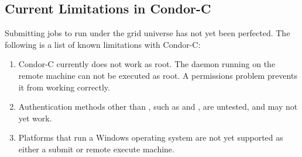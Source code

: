 \subsection{\label{sec:Condor-C-Limits}Current Limitations in Condor-C}
Submitting jobs to run under the grid universe has not yet
been perfected.
The following is a list of known limitations with Condor-C:

\begin{enumerate}
  \item{Condor-C currently does not work as root.
  The  daemon running on the remote machine can not be
  executed as root.
  A permissions problem prevents it from working correctly.  }

  \item{Authentication methods other than
  , such as  and , are 
  untested, and may not yet work.}

  \item{Platforms that run a Windows operating system
are not yet supported as either a submit or remote execute
machine.}
\end{enumerate}




